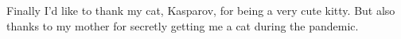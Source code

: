 \begin{acknowledgements}
Finally I'd like to thank my cat, Kasparov, for being a very cute kitty. But also thanks to my mother for secretly getting me a cat during the pandemic.












\end{acknowledgements}
